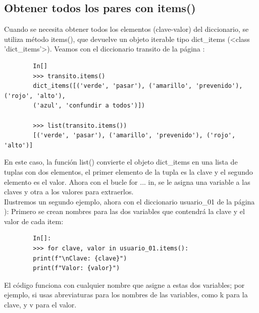 	\subsection{Obtener todos los pares con {\ttfamily items()}}
	
	Cuando se necesita  obtener todos los elementos (clave-valor) del diccionario, se utiliza método {\ttfamily  items()}, 
	que devuelve un objeto iterable tipo {\ttfamily dict\_items} ({\ttfamily <class {}'{}dict\_items{}'{}>{}}). 
	Veamos con el diccionario {\ttfamily transito} de la página \pageref{transito}:
	
	\begin{lstlisting}
		In[]
		>>> transito.items()
		dict_items([('verde', 'pasar'), ('amarillo', 'prevenido'), ('rojo', 'alto'), 
		('azul', 'confundir a todos')])
		
		>>> list(transito.items())
		[('verde', 'pasar'), ('amarillo', 'prevenido'), ('rojo', 'alto')]
	\end{lstlisting}
	
	
	
	
	En este caso,  la función {\ttfamily list()} convierte el objeto {\ttfamily dict\_items} en una lista de tuplas con dos elementos,  el primer elemento de la tupla es la clave y el segundo elemento es el valor. Ahora con el  bucle {\ttfamily for ... in},  se le asigna una variable a las claves y otra a los valores para extraerlos.\\  %
	
	
	
	
	
	
	Ilustremos un segundo ejemplo, ahora con el diccionario {\ttfamily usuario\_01} de la página \pageref{usuario.01}): Primero se crean nombres para las dos variables que contendrá la clave y el valor de cada item:  
	
	\begin{lstlisting}		
		In[]:
		>>> for clave, valor in usuario_01.items():
		print(f"\nClave: {clave}")
		print(f"Valor: {valor}")
	\end{lstlisting}	
	
	\noindent El código funciona  con cualquier nombre que asigne a estas dos variables; por ejemplo,  si usas abreviaturas para los nombres de las variables, como  {\ttfamily k} para la clave, y  {\ttfamily v}  para el valor.\\
	
